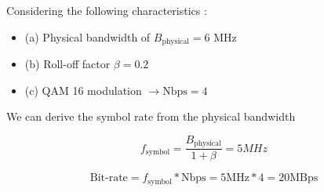 Considering the following characteristics :

    \begin{itemize}
        \item (a) Physical bandwidth of $B_{\text{physical}} = 6$ MHz
        \item (b) Roll-off factor $\beta = 0.2$ 
        \item (c) QAM 16 modulation $\rightarrow \text{Nbps} = 4$
    \end{itemize}

We can derive the symbol rate from the physical bandwidth

\begin{equation*}
    f_{\text{symbol}} = \frac{B_{\text{physical}}}{1+\beta} = 5 MHz
\end{equation*}

\begin{equation*}
    \text{Bit-rate} = f_{\text{symbol}} * \text{Nbps} = 5 \text{MHz} * 4 = 20 \text{MBps}
\end{equation*}

